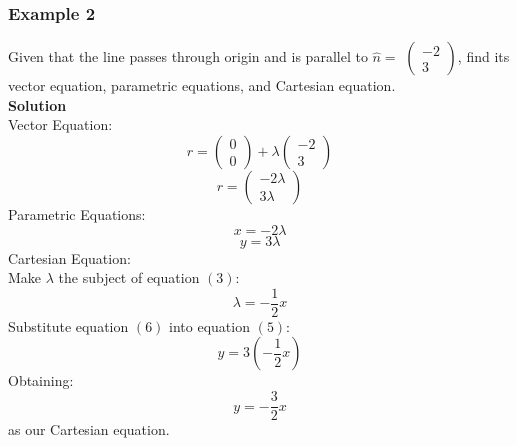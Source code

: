 \documentclass[hidelinks, a4paper, 12pt]{article}
\newcommand{\bd}{\textbf}
\newcommand{\nhat}{\hat{n}}
\newcommand{\n}{\\[\baselineskip]}
\begin{document}
            \subsubsection{Example 2}
                Given that the line passes through origin and is parallel to $\nhat = $
                $\begin{pmatrix}
                    -2 \\ 
                    3
                \end{pmatrix}$,
                find its vector equation, parametric equations, and Cartesian equation.\n
                \bd{Solution}\\
                Vector Equation:
                \[r = \begin{pmatrix} 0 \\ 0 \end{pmatrix} + \lambda \begin{pmatrix} -2 \\ 3 \end{pmatrix}\]
                \[r = \begin{pmatrix} -2\lambda \\ 3\lambda \end{pmatrix}\]
                Parametric Equations:
                \begin{equation}
                    x = -2\lambda
                \end{equation}
                \begin{equation}
                    y = 3\lambda  
                \end{equation}
                Cartesian Equation:\n
                Make $\lambda$ the subject of equation $(3)$: 
                \begin{equation}
                    \lambda = -\frac{1}{2}x 
                \end{equation}
                Substitute equation $(6)$ into equation $(5)$:
                \[y = 3\left(-\frac{1}{2}x\right)\]
                Obtaining:
                \[y = -\frac{3}{2}x\]
                as our Cartesian equation.
\end{document}
